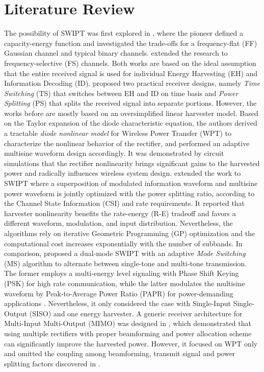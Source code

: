 \documentclass[conference]{IEEEtran}
\begin{document}
\section{Literature Review}
The possibility of SWIPT was first explored in \cite{R.Varshney2008}, where the pioneer defined a capacity-energy function and investigated the trade-offs for a frequency-flat (FF) Gaussian channel and typical binary channels. \cite{Grover2010} extended the research to frequency-selective (FS) channels. Both works are based on the ideal assumption that the entire received signal is used for individual Energy Harvesting (EH) and Information Decoding (ID). \cite{Zhang2013} proposed two practical receiver designs, namely \textit{Time Switching} (TS) that switches between EH and ID on time basis and \textit{Power Splitting} (PS) that splits the received signal into separate portions. However, the works before \cite{Clerckx2016} are mostly based on an oversimplified linear harvester model. Based on the Taylor expansion of the diode characteristic equation, the authors derived a tractable \textit{diode nonlinear model} for Wireless Power Transfer (WPT) to characterize the nonlinear behavior of the rectifier, and performed an adaptive multisine waveform design accordingly. It was demonstrated by circuit simulations that the rectifier nonlinearity brings significant gains to the harvested power and radically influences wireless system design. \cite{Clerckx2018} extended the work to SWIPT where a superposition of modulated information waveform and multisine power waveform is jointly optimized with the power splitting ratio, according to the Channel State Information (CSI) and rate requirements. It reported that harvester nonlinearity benefits the rate-energy (R-E) tradeoff and favors a different waveform, modulation, and input distribution. Nevertheless, the algorithms rely on iterative Geometric Programming (GP) optimization and the computational cost increases exponentially with the number of subbands. In comparison, \cite{Park2018} proposed a dual-mode SWIPT with an adaptive \textit{Mode Switching} (MS) algorithm to alternate between single-tone and multi-tone transmission. The former employs a multi-energy level signaling with Phase Shift Keying (PSK) for high rate communication, while the latter modulates the multisine waveform by Peak-to-Average Power Ratio (PAPR) for power-demanding applications \cite{Krikidis2019}. Nevertheless, it only considered the case with Single-Input Single-Output (SISO) and one energy harvester. A generic receiver architecture for Multi-Input Multi-Output (MIMO) was designed in \cite{Ma2019}, which demonstrated that using multiple rectifiers with proper beamforming and power allocation scheme can significantly improve the harvested power. However, it focused on WPT only and omitted the coupling among beamforming, transmit signal and power splitting factors discovered in \cite{Huang2017}.
\end{document}
